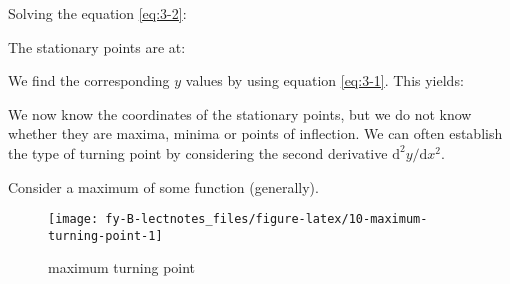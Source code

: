 \documentclass[
  english,
  11pt,
  oneside]{book}
\newcommand{\slide}{}
\theoremstyle{definition}
\theoremstyle{definition}
\theoremstyle{definition}
\theoremstyle{definition}
\theoremstyle{remark}
\begin{document}
\begin{slidesonly}

Solving the equation \eqref{eq:3-2}:

\vfill

The stationary points are at:

\vfill

We find the corresponding \(y\) values by using equation \eqref{eq:3-1}. This yields:

\vfill

We now know the coordinates of the stationary points, but we do not know whether they are maxima, minima or points of inflection. We can often establish the type of turning point by considering the second derivative \(\mathrm{d}^{2}y/\mathrm{d} x^2\).

\end{slidesonly}

\slide

Consider a maximum of some function (generally).

\begin{figure}

{\centering \texttt{[image: fy-B-lectnotes\_files/figure-latex/10-maximum-turning-point-1]} 

}

\caption{maximum turning point}\label{fig:10-maximum-turning-point}
\end{figure}
\end{document}

